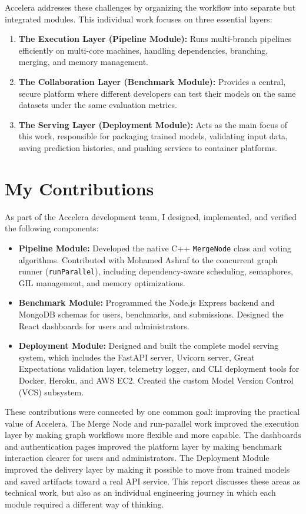 \documentclass[12pt,a4paper,oneside]{report}
\newcommand{\systemname}{Accelera}
\newcommand{\modulepath}[1]{\texttt{#1}}
\begin{document}
\systemname{} addresses these challenges by organizing the workflow into separate but integrated modules. This individual work focuses on three essential layers:
\begin{enumerate}
    \item \textbf{The Execution Layer (Pipeline Module):} Runs multi-branch pipelines efficiently on multi-core machines, handling dependencies, branching, merging, and memory management.
    \item \textbf{The Collaboration Layer (Benchmark Module):} Provides a central, secure platform where different developers can test their models on the same datasets under the same evaluation metrics.
    \item \textbf{The Serving Layer (Deployment Module):} Acts as the main focus of this work, responsible for packaging trained models, validating input data, saving prediction histories, and pushing services to container platforms.
\end{enumerate}

\section{My Contributions}
As part of the \systemname{} development team, I designed, implemented, and verified the following components:
\begin{itemize}[leftmargin=*]
    \item \textbf{Pipeline Module:} Developed the native C++ \modulepath{MergeNode} class and voting algorithms. Contributed with Mohamed Ashraf to the concurrent graph runner (\modulepath{runParallel}), including dependency-aware scheduling, semaphores, GIL management, and memory optimizations.
    \item \textbf{Benchmark Module:} Programmed the Node.js Express backend and MongoDB schemas for users, benchmarks, and submissions. Designed the React dashboards for users and administrators.
    \item \textbf{Deployment Module:} Designed and built the complete model serving system, which includes the FastAPI server, Uvicorn server, Great Expectations validation layer, telemetry logger, and CLI deployment tools for Docker, Heroku, and AWS EC2. Created the custom Model Version Control (VCS) subsystem.
\end{itemize}

These contributions were connected by one common goal: improving the practical value of \systemname{}. The Merge Node and run-parallel work improved the execution layer by making graph workflows more flexible and more capable. The dashboards and authentication pages improved the platform layer by making benchmark interaction clearer for users and administrators. The Deployment Module improved the delivery layer by making it possible to move from trained models and saved artifacts toward a real API service. This report discusses these areas as technical work, but also as an individual engineering journey in which each module required a different way of thinking.
\end{document}
